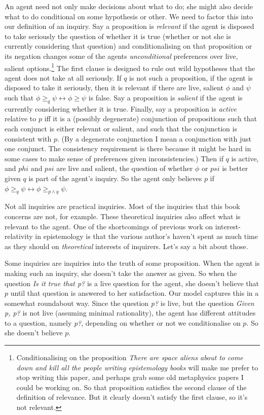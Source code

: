 An agent need not only make decisions about what to do; she might also decide what to do conditional on some hypothesis or other. We need to factor this into our definition of an inquiry. Say a proposition is \textit{relevant} if the agent is disposed to take seriously the question of whether it is true (whether or not she is currently considering that question) and conditionalising on that proposition or its negation changes some of the agents \textit{unconditional} preferences over live, salient options.\footnote{Conditionalising on the proposition \textit{There are space aliens about to come down and kill all the people writing epistemology books} will make me prefer to stop writing this paper, and perhaps grab some old metaphysics papers I could be working on. So that proposition satisfies the second clause of the definition of relevance. But it clearly doesn't satisfy the first clause, so it's not relevant.} The first clause is designed to rule out wild hypotheses that the agent does not take at all seriously. If \(q\) is not such a proposition, if the agent is disposed to take it seriously, then it is relevant if there are live, salient \(\phi\) and \(\psi\) such that \(\phi \geq _q \psi \leftrightarrow  \phi \geq \psi\) is false. Say a proposition is \textit{salient} if the agent is currently considering whether it is true. Finally, say a proposition is \textit{active} relative to \(p\) iff it is a (possibly degenerate) conjunction of propositions such that each conjunct is either relevant or salient, and such that the conjunction is consistent with \(p\). (By a degenerate conjunction I mean a conjunction with just one conjunct. The consistency requirement is there because it might be hard in some cases to make sense of preferences given inconsistencies.) Then if \(q\) is active, and \(phi\) and \(psi\) are live and salient, the question of whether \(\phi\) or \(psi\) is better given \(q\) is part of the agent's inquiry. So the agent only believes \(p\) if \(\phi \geq _q \psi \leftrightarrow \phi \geq _{p \wedge q} \psi\).

Not all inquiries are practical inquiries. Most of the inquiries that this book concerns are not, for example. These theoretical inquiries also affect what is relevant to the agent. One of the shortcomings of previous work on interest-relativity in epistemology is that the various author's haven't spent as much time as they should on \textit{theoretical} interests of inquirers. Let's say a bit about those.

Some inquiries are inquiries into the truth of some proposition. When the agent is making such an inquiry, she doesn't take the answer as given. So when the question \textit{Is it true that p?} is a live question for the agent, she doesn't believe that \(p\) until that question is answered to her satisfaction. Our model captures this in a somewhat roundabout way. Since the question \textit{p?} is live, but the question \textit{Given p, p?} is not live (assuming minimal rationality), the agent has different attitudes to a question, namely \textit{p?}, depending on whether or not we conditionalise on \(p\). So she doesn't believe \(p\).

